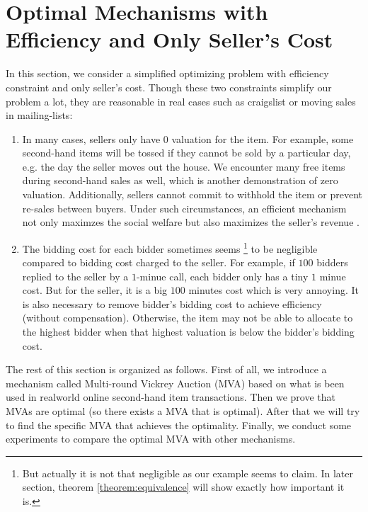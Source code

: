 \section{Optimal Mechanisms with Efficiency and Only Seller's Cost}

In this section, we consider a simplified optimizing problem with efficiency
constraint and only seller's cost.  Though these two
constraints simplify our problem a lot, they are reasonable in real cases such
as craigslist or moving sales in mailing-lists:

\begin{enumerate}

\item In many cases, sellers only have $0$ valuation for the item.
For example, some second-hand items will be tossed if they cannot be sold by a
particular day, e.g. the day the seller moves out the house. We encounter many
free items during second-hand sales as well, which is another demonstration of
zero valuation. Additionally, sellers cannot commit to withhold the item or 
prevent re-sales between buyers. Under such circumstances, an efficient mechanism not only
maximzes the social welfare but also maximizes the seller's revenue \cite{Ausubel99:EfficientOptimality}.

\item The bidding cost for each bidder sometimes seems \footnote{But actually
it is not that negligible as our example seems to claim. In later section,
theorem \ref{theorem:equivalence} will show exactly how important it is.} to be
negligible compared to bidding cost charged to the seller. For example, if
$100$ bidders replied to the seller by a $1$-minue call, each bidder only has a
tiny $1$ minue cost.  But for the seller, it is a big $100$ minutes cost which
is very annoying. It is also necessary to remove bidder's bidding cost to
achieve efficiency (without compensation).  Otherwise, the item may not be able
to allocate to the highest bidder when that highest valuation is below the
bidder's bidding cost.

\end{enumerate}

The rest of this section is organized as follows. First of all, we introduce a
mechanism called Multi-round Vickrey Auction (MVA) based on what is been used in
realworld online second-hand item transactions.  Then we prove that MVAs are
optimal (so there exists a MVA that is optimal). After that we will try to find
the specific MVA that achieves the optimality. Finally, we conduct some
experiments to compare the optimal MVA with other mechanisms.

